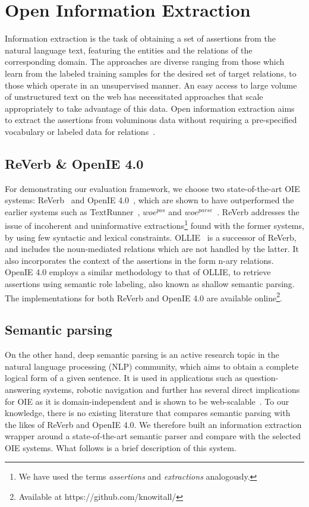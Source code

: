 \documentclass{llncs}
\begin{document}
\section{Open Information Extraction}
\label{sec:oie}
Information extraction is the task of obtaining a set of assertions from the natural language text, featuring the entities and the relations of the corresponding domain. The approaches are diverse ranging from those which learn from the labeled training samples for the desired set of target relations, to those which operate in an unsupervised manner. An easy access to large volume of unstructured text on the web has necessitated approaches that scale appropriately to take advantage of this data. Open information extraction aims to extract the assertions from voluminous data without requiring a pre-specified vocabulary or labeled data for relations~\cite{Etzioni2008a}.

\subsection{ReVerb \& OpenIE 4.0}
For demonstrating our evaluation framework, we choose two state-of-the-art OIE systems: ReVerb~\cite{Fader2011a} and OpenIE 4.0~\cite{Mausam2012a}, which are shown to have outperformed the earlier systems such as TextRunner~\cite{Etzioni2008a}, $woe^{pos}$ and $woe^{parse}$~\cite{Wu2010a}. ReVerb addresses the issue of incoherent and uninformative extractions\footnote{We have used the terms \textit{assertions} and \textit{extractions} analogously.} found with the former systems, by using few syntactic and lexical constraints. OLLIE~\cite{Mausam2012a} is a successor of ReVerb, and includes the noun-mediated relations which are not handled by the latter. It also incorporates the context of the assertions in the form n-ary relations. OpenIE 4.0 employs a similar methodology to that of OLLIE, to retrieve assertions using semantic role labeling, also known as shallow semantic parsing. The implementations for both ReVerb and OpenIE 4.0 are available online\footnote{Available at https://github.com/knowitall/}.

\subsection{Semantic parsing}
On the other hand, deep semantic parsing is an active research topic in the natural language processing (NLP) community, which aims to obtain a complete logical form of a given sentence. It is used in applications such as question-answering systems, robotic navigation and further has several direct implications for OIE as it is domain-independent and is shown to be web-scalable~\cite{Harrington2007}. To our knowledge, there is no existing literature that compares semantic parsing with the likes of ReVerb and OpenIE 4.0. We therefore built an information extraction wrapper around a state-of-the-art semantic parser and compare with the selected OIE systems. What follows is a brief description of this system.
\end{document}
